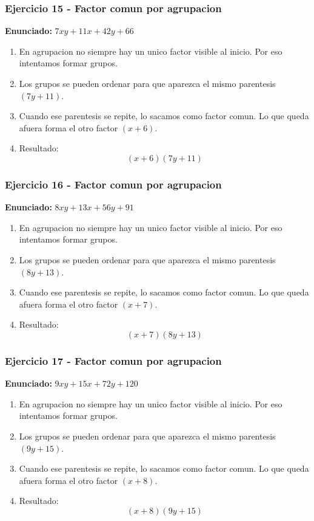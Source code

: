 \documentclass[11pt,a4paper]{article}
\begin{document}
\vspace{0.2cm}
\subsubsection*{Ejercicio 15 - Factor comun por agrupacion}
\textbf{Enunciado:} $ 7 x y + 11 x + 42 y + 66 $\par
\begin{enumerate}[leftmargin=2em]
\item En agrupacion no siempre hay un unico factor visible al inicio. Por eso intentamos formar grupos.
\item Los grupos se pueden ordenar para que aparezca el mismo parentesis \((7 y + 11)\).
\item Cuando ese parentesis se repite, lo sacamos como factor comun. Lo que queda afuera forma el otro factor \((x + 6)\).
\item Resultado: \[\boxed{\left(x + 6\right)\left(7 y + 11\right)}\]
\end{enumerate}

\vspace{0.2cm}
\subsubsection*{Ejercicio 16 - Factor comun por agrupacion}
\textbf{Enunciado:} $ 8 x y + 13 x + 56 y + 91 $\par
\begin{enumerate}[leftmargin=2em]
\item En agrupacion no siempre hay un unico factor visible al inicio. Por eso intentamos formar grupos.
\item Los grupos se pueden ordenar para que aparezca el mismo parentesis \((8 y + 13)\).
\item Cuando ese parentesis se repite, lo sacamos como factor comun. Lo que queda afuera forma el otro factor \((x + 7)\).
\item Resultado: \[\boxed{\left(x + 7\right)\left(8 y + 13\right)}\]
\end{enumerate}

\vspace{0.2cm}
\subsubsection*{Ejercicio 17 - Factor comun por agrupacion}
\textbf{Enunciado:} $ 9 x y + 15 x + 72 y + 120 $\par
\begin{enumerate}[leftmargin=2em]
\item En agrupacion no siempre hay un unico factor visible al inicio. Por eso intentamos formar grupos.
\item Los grupos se pueden ordenar para que aparezca el mismo parentesis \((9 y + 15)\).
\item Cuando ese parentesis se repite, lo sacamos como factor comun. Lo que queda afuera forma el otro factor \((x + 8)\).
\item Resultado: \[\boxed{\left(x + 8\right)\left(9 y + 15\right)}\]
\end{enumerate}
\end{document}

